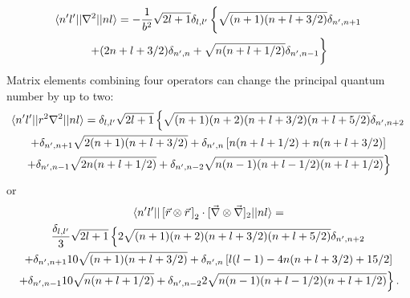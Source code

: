 \begin{multline}
\braket{n'l' || \nabla^2 || nl } =  - \frac{1}{b^2} \sqrt{2l+1}\delta_{l,l'}\left\{\sqrt{(n+1)(n+l+3/2)}\delta_{n',n+1} \vphantom{\frac{1}{1}} \right.\\
\left.+(2n+l+3/2)\delta_{n',n}+\sqrt{n(n+l+1/2)}\delta_{n',n-1}\vphantom{\frac{1}{1}} \right\}
\end{multline}
Matrix elements combining four operators can change the principal quantum number by up to two:
\begin{multline}
\braket{n'l' || r^2 \nabla^2 || nl } = \delta_{l,l'}\sqrt{2l+1}
\left\{\sqrt{(n+1)(n+2)(n+l+3/2)(n+l+5/2)}\delta_{n',n+2}\right.\\
+\delta_{n',n+1}\sqrt{2(n+1)(n+l+3/2)}+\delta_{n',n}\left[n(n+l+1/2)+n(n+l+3/2)\right]\\
\left.+\delta_{n',n-1}\sqrt{2n(n+l+1/2)}+\delta_{n',n-2}\sqrt{n(n-1)(n+l-1/2)(n+l+1/2)}\right\}
\end{multline}
or
\begin{multline}
\braket{n'l' || \left[\vec{r}\otimes\vec{r}\hspace{.5mm}\right]_2\cdot [\vec{\nabla}\otimes\vec{\nabla}]_2 || nl } = \\
\frac{\delta_{l,l'}}{3}\sqrt{2l+1}
\left\{2\sqrt{(n+1)(n+2)(n+l+3/2)(n+l+5/2)}\delta_{n',n+2}\right.\\
+\delta_{n',n+1}10\sqrt{(n+1)(n+l+3/2)}+\delta_{n',n}\left[l(l-1)-4n(n+l+3/2)+15/2\right]\\
\left.+\delta_{n',n-1}10\sqrt{n(n+l+1/2)}+\delta_{n',n-2}2\sqrt{n(n-1)(n+l-1/2)(n+l+1/2)}\right\}.
\end{multline}